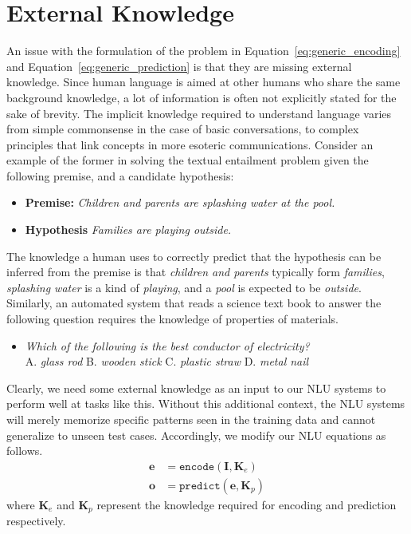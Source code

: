 \section{External Knowledge}
An issue with the formulation of the problem in Equation~\ref{eq:generic_encoding} and Equation~\ref{eq:generic_prediction} is that they are missing external knowledge. 
Since human language is aimed at other humans who share 
the same background knowledge, a lot of information is often not explicitly stated
for the sake of brevity. The implicit knowledge required to understand language varies 
from simple commonsense in the case of basic conversations, to complex principles that link 
concepts in more esoteric communications. Consider an example of the former in solving the 
textual entailment problem given the following premise, and a candidate hypothesis:
\begin{itemize}
 \item \textbf{Premise:} \textit{Children and parents are splashing water at the pool.}
 \item \textbf{Hypothesis} \textit{Families are playing outside.}
\end{itemize}
The knowledge a human uses to correctly predict that the hypothesis can be inferred from the 
premise is that \textit{children and parents} typically form \textit{families}, \textit{splashing water} 
is a kind of \textit{playing}, and a \textit{pool} is expected to be \textit{outside}. Similarly, an 
automated system that reads a science text book to answer the following 
question requires the knowledge of properties of materials.
\begin{itemize}
 \item \textit{Which of the following is the best conductor of electricity?}\\ 
  A. \textit{glass rod}  B. \textit{wooden stick}  C. \textit{plastic straw} D. \textit{metal nail}
\end{itemize}
Clearly, we need some external knowledge as an input to our NLU systems to perform well at tasks like this.
Without this additional context, the NLU systems will merely memorize specific patterns seen in the training data
and cannot generalize to unseen test cases. Accordingly, we modify our NLU equations as follows.
\begin{align}
 \mathbf{e} &= \mathtt{encode}(\mathbf{I}, \mathbf{K}_e) \label{eq:encoding_with_knowledge}\\
 \mathbf{o} &= \mathtt{predict}(\mathbf{e}, \mathbf{K}_p) \label{eq:prediction_with_knowledge}
\end{align}
where $\mathbf{K}_e$ and $\mathbf{K}_p$ represent the knowledge required for encoding and prediction respectively. 



